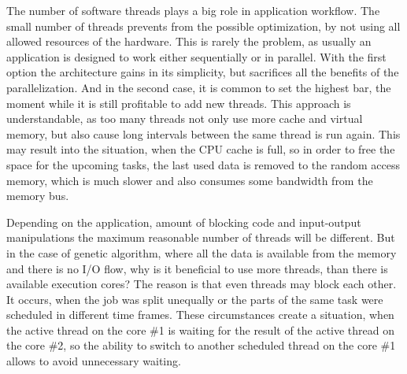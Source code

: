 The number of software threads plays a big role in application workflow. The small number of threads prevents from the possible optimization, by not using all allowed resources of the hardware. This is rarely the problem, as usually an application is designed to work either sequentially or in parallel. With the first option the architecture gains in its simplicity, but sacrifices all the benefits of the parallelization. And in the second case, it is common to set the highest bar, the moment while it is still profitable to add new threads. This approach is understandable, as too many threads not only use more cache and virtual memory, but also cause long intervals between the same thread is run again. This may result into the situation, when the CPU cache is full, so in order to free the space for the upcoming tasks, the last used data is removed to the random access memory, which is much slower and also consumes some bandwidth from the memory bus.

Depending on the application, amount of blocking code and input-output manipulations the maximum reasonable number of threads will be different. But in the case of genetic algorithm, where all the data is available from the memory and there is no I/O flow, why is it beneficial to use more threads, than there is available execution cores? The reason is that even threads may block each other. It occurs, when the job was split unequally or the parts of the same task were scheduled in different time frames. These circumstances create a situation, when the active thread on the core \#1 is waiting for the result of the active thread on the core \#2, so the ability to switch to another scheduled thread on the core \#1 allows to avoid unnecessary waiting.  